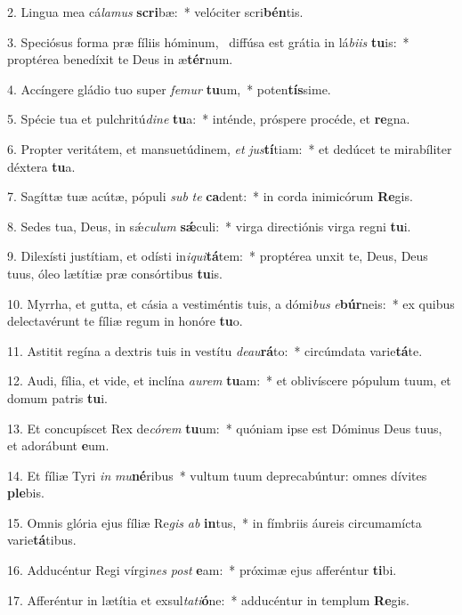 2. Lingua mea cá\textit{la}\textit{mus} \textbf{scri}bæ:~*  velóciter scri\textbf{bén}tis.\

3. Speciósus forma præ fíliis hóminum, \dag\  diffúsa est grátia in lá\textit{bi}\textit{is} \textbf{tu}is:~*  proptérea benedíxit te Deus in æ\textbf{tér}num.\

4. Accíngere gládio tuo super \textit{fe}\textit{mur} \textbf{tu}um,~*  poten\textbf{tís}sime.\

5. Spécie tua et pulchritú\textit{di}\textit{ne} \textbf{tu}a:~*  inténde, próspere procéde, et \textbf{re}gna.\

6. Propter veritátem, et mansuetúdinem, \textit{et} \textit{jus}\textbf{tí}tiam:~*  et dedúcet te mirabíliter déxtera \textbf{tu}a.\

7. Sagíttæ tuæ acútæ, pópuli \textit{sub} \textit{te} \textbf{ca}dent:~*  in corda inimicórum \textbf{Re}gis.\

8. Sedes tua, Deus, in sǽ\textit{cu}\textit{lum} \textbf{sǽ}culi:~*  virga directiónis virga regni \textbf{tu}i.\

9. Dilexísti justítiam, et odísti in\textit{i}\textit{qui}\textbf{tá}tem:~*  proptérea unxit te, Deus, Deus tuus, óleo lætítiæ præ consórtibus \textbf{tu}is.\

10. Myrrha, et gutta, et cásia a vestiméntis tuis, a dómi\textit{bus} \textit{e}\textbf{búr}neis:~*  ex quibus delectavérunt te fíliæ regum in honóre \textbf{tu}o.\

11. Astitit regína a dextris tuis in vestítu \textit{de}\textit{au}\textbf{rá}to:~*  circúmdata varie\textbf{tá}te.\

12. Audi, fília, et vide, et inclína \textit{au}\textit{rem} \textbf{tu}am:~*  et oblivíscere pópulum tuum, et domum patris \textbf{tu}i.\

13. Et concupíscet Rex de\textit{có}\textit{rem} \textbf{tu}um:~*  quóniam ipse est Dóminus Deus tuus, et adorábunt \textbf{e}um.\

14. Et fíliæ Tyri \textit{in} \textit{mu}\textbf{né}ribus~*  vultum tuum deprecabúntur: omnes dívites \textbf{ple}bis.\

15. Omnis glória ejus fíliæ Re\textit{gis} \textit{ab} \textbf{in}tus,~*  in fímbriis áureis circumamícta varie\textbf{tá}tibus.\

16. Adducéntur Regi vírgi\textit{nes} \textit{post} \textbf{e}am:~*  próximæ ejus afferéntur \textbf{ti}bi.\

17. Afferéntur in lætítia et exsul\textit{ta}\textit{ti}\textbf{ó}ne:~*  adducéntur in templum \textbf{Re}gis.\


